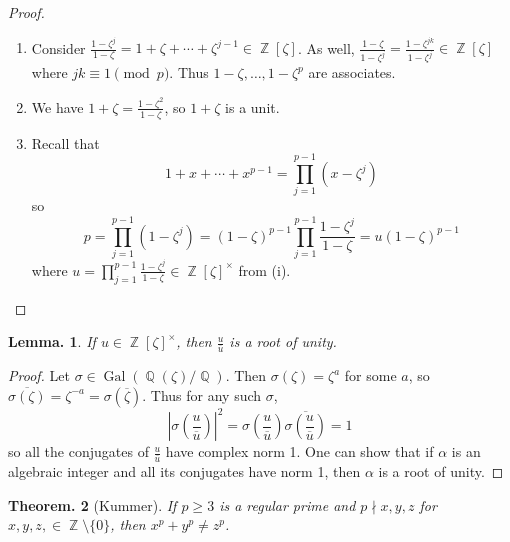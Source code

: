 \documentclass[11pt, a4paper]{memoir}
\DeclareMathOperator{\Q}{{\mathbb{Q}}}
\DeclareMathOperator{\Z}{{\mathbb{Z}}}
\newcommand{\ol}[1]{\ensuremath{\overline{#1}}}
\theoremstyle{change}
\newtheorem{theorem}{Theorem.}[section]
\newtheorem{lemma}[theorem]{Lemma.}
\theoremstyle{plain}
\theoremstyle{nonumberplain}
\newtheorem{proof}{Proof}
\DeclareMathOperator{\Gal}{Gal}
\numberwithin{equation}{section}
\begin{document}
\begin{proof}
    \begin{enumerate}[r]
        \item Consider $\frac{1-\zeta^j}{1-\zeta}=1+\zeta+\cdots+\zeta^{j-1}\in\Z[\zeta]$.
            As well, $\frac{1-\zeta}{1-\zeta^j}=\frac{1-\zeta^{jk}}{1-\zeta^j}\in\Z[\zeta]$ where $jk\equiv 1\pmod{p}$.
            Thus $1-\zeta,\ldots,1-\zeta^p$ are associates.
        \item We have $1+\zeta=\frac{1-\zeta^2}{1-\zeta}$, so $1+\zeta$ is a unit.
        \item Recall that
            \begin{equation*}
                1+x+\cdots+x^{p-1}=\prod_{j=1}^{p-1}(x-\zeta^j)
            \end{equation*}
            so
            \begin{equation*}
                p=\prod_{j=1}^{p-1}(1-\zeta^j)=(1-\zeta)^{p-1}\prod_{j=1}^{p-1}\frac{1-\zeta^j}{1-\zeta}=u(1-\zeta)^{p-1}
            \end{equation*}
            where $u=\prod_{j=1}^{p-1}\frac{1-\zeta^j}{1-\zeta}\in\Z[\zeta]^\times$ from (i).
    \end{enumerate}
\end{proof}
\begin{lemma}\label{l:km2}
    If $u\in\Z[\zeta]^\times$, then $\frac{u}{\ol{u}}$ is a root of unity.
\end{lemma}
\begin{proof}
    Let $\sigma\in\Gal(\Q(\zeta)/\Q)$.
    Then $\sigma(\zeta)=\zeta^a$ for some $a$, so $\ol{\sigma(\zeta)}=\zeta^{-a}=\sigma(\ol{\zeta})$.
    Thus for any such $\sigma$,
    \begin{equation*}
        \left\lvert\sigma\left(\frac{u}{\ol{u}}\right)\right\rvert^2=\sigma\left(\frac{u}{\ol{u}}\right)\ol{\sigma\left(\frac{u}{\ol{u}}\right)}=1
    \end{equation*}
    so all the conjugates of $\frac{u}{\ol{u}}$ have complex norm 1.
    One can show that if $\alpha$ is an algebraic integer and all its conjugates have norm 1, then $\alpha$ is a root of unity.
\end{proof}
\begin{theorem}[Kummer]
    If $p\geq 3$ is a regular prime and $p\nmid x,y,z$ for $x,y,z,\in\Z\setminus\{0\}$, then $x^p+y^p\neq z^p$.
\end{theorem}
\end{document}

